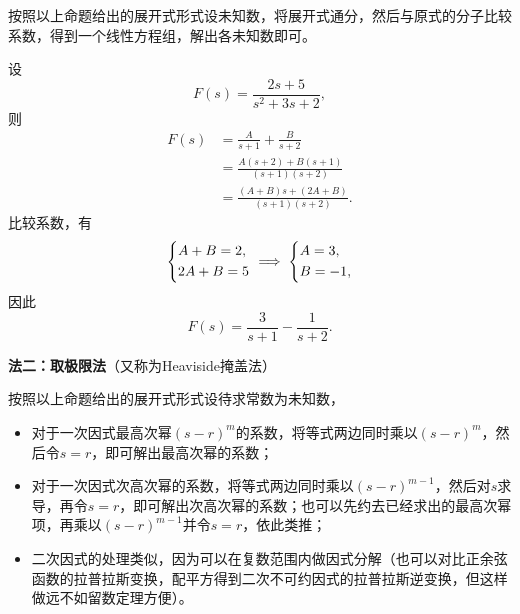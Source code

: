 按照以上命题给出的展开式形式设未知数，将展开式通分，然后与原式的分子比较系数，得到一个线性方程组，解出各未知数即可。
\begin{example}
    设
    \begin{equation}
        F(s)=\frac{2s+5}{s^2+3s+2},
    \end{equation}
    则
    \begin{align}
        F(s)&=\frac{A}{s+1}+\frac{B}{s+2}\nonumber\\
        &=\frac{A(s+2)+B(s+1)}{(s+1)(s+2)}\nonumber\\
        &=\frac{(A+B)s+(2A+B)}{(s+1)(s+2)}.
    \end{align}
    比较系数，有
    \begin{equation}
        \begin{dcases}
            A+B=2,\\
            2A+B=5
        \end{dcases}\implies\begin{dcases}
            A=3,\\
            B=-1,
        \end{dcases}
    \end{equation}
    因此
    \begin{equation}
        F(s)=\frac{3}{s+1}-\frac{1}{s+2}.
    \end{equation}
\end{example}

\noindent \textbf{法二：取极限法}（又称为Heaviside掩盖法）

按照以上命题给出的展开式形式设待求常数为未知数，
\begin{itemize}
    \item 对于一次因式最高次幂$(s-r)^m$的系数，将等式两边同时乘以$(s-r)^m$，然后令$s= r$，即可解出最高次幂的系数；
    \item 对于一次因式次高次幂的系数，将等式两边同时乘以$(s-r)^{m-1}$，然后对$s$求导，再令$s= r$，即可解出次高次幂的系数；也可以先约去已经求出的最高次幂项，再乘以$(s-r)^{m-1}$并令$s= r$，依此类推；
    \item 二次因式的处理类似，因为可以在复数范围内做因式分解（也可以对比正余弦函数的拉普拉斯变换，配平方得到二次不可约因式的拉普拉斯逆变换，但这样做远不如留数定理方便）。
\end{itemize}

